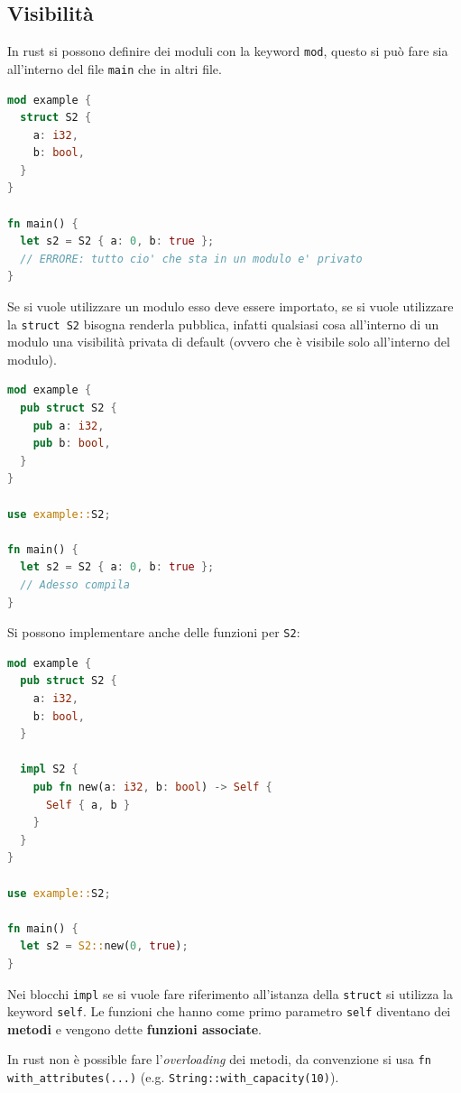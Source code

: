 \documentclass[12pt]{article}
\begin{document}
\subsection{Visibilit\`a}
In rust si possono definire dei moduli con la keyword \texttt{mod}, questo si pu\`o fare sia all'interno del file \texttt{main} che in altri file.
\begin{lstlisting}[language=rust]
mod example {
  struct S2 {
    a: i32,
    b: bool,
  }
}

fn main() {
  let s2 = S2 { a: 0, b: true };
  // ERRORE: tutto cio' che sta in un modulo e' privato
}
\end{lstlisting}
Se si vuole utilizzare un modulo esso deve essere importato, se si vuole utilizzare la \texttt{struct S2} bisogna renderla pubblica, infatti qualsiasi cosa all'interno di un modulo una visibilit\`a privata di default (ovvero che \`e visibile solo all'interno del modulo).
\begin{lstlisting}[language=rust]
mod example {
  pub struct S2 {
    pub a: i32,
    pub b: bool,
  }
}

use example::S2;

fn main() {
  let s2 = S2 { a: 0, b: true };
  // Adesso compila
}
\end{lstlisting}
Si possono implementare anche delle funzioni per \texttt{S2}:
\begin{lstlisting}[language=rust]
mod example {
  pub struct S2 {
    a: i32,
    b: bool,
  }

  impl S2 {
    pub fn new(a: i32, b: bool) -> Self {
      Self { a, b }
    }
  }
}

use example::S2;

fn main() {
  let s2 = S2::new(0, true);
}
\end{lstlisting}
Nei blocchi \texttt{impl} se si vuole fare riferimento all'istanza della \texttt{struct} si utilizza la keyword \texttt{self}. Le funzioni che hanno come primo parametro \texttt{self} diventano dei \textbf{metodi} e vengono dette \textbf{funzioni associate}.

\hfill

In rust non \`e possible fare l'\emph{overloading} dei metodi, da convenzione si usa \texttt{fn with\_attributes(...)} (e.g. \verb|String::with_capacity(10)|).
\end{document}
